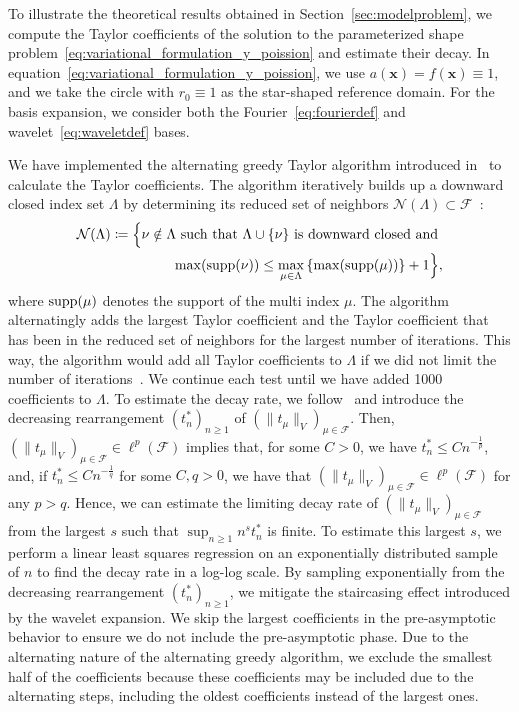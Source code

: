 To illustrate the theoretical results obtained in Section~\ref{sec:modelproblem}, we compute the Taylor coefficients of the solution to the parameterized shape problem~\eqref{eq:variational_formulation_y_poission} and estimate their decay.
In equation~\eqref{eq:variational_formulation_y_poission}, we use $a(\bm{x}) = f(\bm{x}) \equiv 1$, and we take the circle with $r_0\equiv 1$ as the star-shaped reference domain.
For the basis expansion, we consider both the Fourier~\eqref{eq:fourierdef} and wavelet~\eqref{eq:waveletdef} bases.


We have implemented the alternating greedy Taylor algorithm introduced in~\cite{cohen2015} to calculate the Taylor coefficients.
The algorithm iteratively builds up a downward closed index set $\Lambda$ by determining its reduced set of neighbors $\mathcal{N}(\Lambda) \subset \mathcal{F}$~\cite{cohen2015}:
\begin{align*}
	\mathcal{N}(\Lambda)\coloneqq \Big\{   \nu \notin \Lambda \text{ such that } \Lambda \cup \{\nu\} \text{ is downward closed and }\\ \max(\operatorname{supp}(\nu)) \leq \max_{\mu \in \Lambda}\left\{\max(\operatorname{supp}(\mu))\right\} +1 \Big\},
\end{align*}
where $\operatorname{supp}(\mu)$ denotes the support of the multi index $\mu$.
The algorithm alternatingly adds the largest Taylor coefficient and the Taylor coefficient that has been in the reduced set of neighbors for the largest number of iterations.
This way, the algorithm would add all Taylor coefficients to $\Lambda$ if we did not limit the number of iterations~\cite{cohen2015}.
We continue each test until we have added 1000 coefficients to $\Lambda$.
To estimate the decay rate, we follow~\cite{bachmayr2017a} and introduce the decreasing rearrangement $(t^*_n)_{n\geq 1}$ of $(\|t_\mu\|_{V})_{\mu \in \mathcal{F}}$.
Then, $(\|t_\mu\|_{V})_{\mu \in \mathcal{F}} \in \ell^p(\mathcal{F})$ implies that, for some $C>0$, we have $t^*_n \leq Cn^{-\frac{1}{p}}$, and, if $t^*_n \leq Cn^{-\frac{1}{q}}$ for some $C,q > 0$, we have that $(\|t_\mu\|_{V})_{\mu \in \mathcal{F}} \in \ell^p(\mathcal{F})$ for any $p > q$.
Hence, we can estimate the limiting decay rate of $(\|t_\mu\|_{V})_{\mu \in \mathcal{F}}$ from the largest $s$ such that $\sup_{n \geq 1} n^s t^*_n$ is finite.
To estimate this largest $s$, we perform a linear least squares regression on an exponentially distributed sample of $n$  to find the decay rate in a log-log scale.
By sampling exponentially from the decreasing rearrangement $(t^*_n)_{n \geq 1}$, we mitigate the staircasing effect introduced by the wavelet expansion.
We skip the largest coefficients in the pre-asymptotic behavior to ensure we do not include the pre-asymptotic phase.
Due to the alternating nature of the alternating greedy algorithm, we exclude the smallest half of the coefficients because these coefficients may be included due to the alternating steps, including the oldest coefficients instead of the largest ones.

